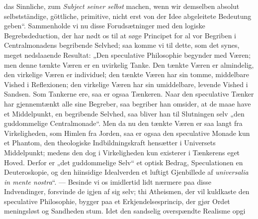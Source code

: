 \documentclass[12pt]{book}
\newcommand{\opage}[1]{\marginnote{\footnotesize\textit{[#1]}}}
\begin{document}
das Sinnliche, zum \emph{Subject seiner selbst} machen, wenn wir demselben absolut
selbstständige, göttliche, primitive, nicht erst von der Idee abgeleitete Bedeutung
geben“. Sammenholde vi nu disse Forudsætninger med den logiske Begrebsdeduction, der har
nødt os til at søge Principet for al vor Begriben i Centralmonadens begribende Selvhed;
saa komme vi til dette, som det synes, meget nedslaaende Resultat: „Den speculative
Philosophie begynder med Væren; men denne tænkte Væren er en uvirkelig Tanke. Den tænkte
Væren er almindelig, den virkelige Væren er individuel; den tænkte Væren har sin tomme,
middelbare Vished i Reflexionen; den virkelige Væren har sin umiddelbare, levende Vished i
Sandsen. Som Tankerne ere, saa er ogsaa Tænkeren. Naar den speculative Tænker har
gjennemtænkt alle sine Begreber, saa begriber han omsider, at de maae have et
Middelpunkt, en begribende Selvhed, saa bliver han til Slutningen selv „den guddommelige
Centralmonade“. Men da nu den tænkte Væren er saa langt fra Virkeligheden, som Himlen fra
Jorden, saa er ogsaa den speculative Monade kun et Phantom, den theologiske
Indbildningskraft hensætter i Universets Middelpunkt; medens den dog i Virkeligheden kun
existerer i Tænkerens eget Hoved. Derfor er „det guddommelige Selv“ et optisk Bedrag,
Speculationen en Deuteroskopie, og den hiinsidige Idealverden et luftigt Gjenbillede af
\textit{universalia in mente nostra}“. --- Besinde vi os imidlertid lidt nærmere paa disse
Indvendinger, forsvinde de igjen af sig selv; thi Atheismen, der vil kuldkaste den
speculative Philosophie, bygger paa et Erkjendelsesprincip, der gjør Ordet meningsløst og
Sandheden stum. Idet den sandselig overspændte Realisme opgi%
\opage{195}%
\end{document}
